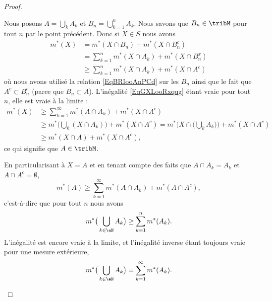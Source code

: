 \begin{proof}
\begin{subproof}
\begin{subproof}
			Nous posons \( A=\bigcup_kA_k\) et \( B_n=\bigcup_{k=1}^nA_k\). Nous savons que \( B_n\in\tribM\) pour tout \( n\) par le point précédent. Donc si \( X\in S\) nous avons
			\begin{subequations}
				\begin{align}   \label{EqGXLooRxqqg}
					m^*(X) & =m^*(X\cap B_n)+m^*(X\cap B_n^c)                \\
					       & =   \sum_{k=1}^nm^*(X\cap A_k)+m^*(X\cap B_n^x) \\
					       & \geq\sum_{k=1}^nm^*(X\cap A_k)+m^*(X\cap A^c)
				\end{align}
			\end{subequations}
			où nous avons utilisé la relation \eqref{EqBRIooAnPCd} sur les \( B_n\) ainsi que le fait que \( A^c\subset B_n^c\) (parce que \( B_n\subset A\)). L'inégalité \eqref{EqGXLooRxqqg} étant vraie pour tout \( n\), elle est vraie à la limite :
			\begin{subequations}
				\begin{align}
					m^*(X) & \geq \sum_{k=1}^{\infty}m^*(A\cap A_k)+m^*(X\cap A^c)    \\
					       & \geq m^*\Big( \bigcup_k(X\cap A_k) \Big)+m^*(X\cap A^c)
					=    m^*\Big( X\cap \big( \bigcup_kA_k \big) \Big)+m^*(X\cap A^c) \\
					       & \geq m^*(X\cap A)+m^*(X\cap A^c),
				\end{align}
			\end{subequations}
			ce qui signifie que \( A\in\tribM\).

			En particularisant à \( X=A\) et en tenant compte des faits que \( A\cap A_k=A_k\) et \( A\cap A^c=\emptyset\),
			\begin{equation}
				m^*(A)\geq \sum_{k=1}^{\infty}m^*(A\cap A_k)+m^*(A\cap A^c),
			\end{equation}
			c'est-à-dire que pour tout \( n\) nous avons
			\begin{equation}
				m^*\big( \bigcup_{k\in \eN}A_k \big)\geq \sum_{k=1}^nm^*(A_k).
			\end{equation}
			L'inégalité est encore vraie à la limite, et l'inégalité inverse étant toujours vraie pour une mesure extérieure,
			\begin{equation}
				m^*\big( \bigcup_{k\in \eN}A_k \big)=\sum_{k=1}^{\infty}m^*(A_k).
			\end{equation}
		\end{subproof}


\end{subproof}
\end{proof}
